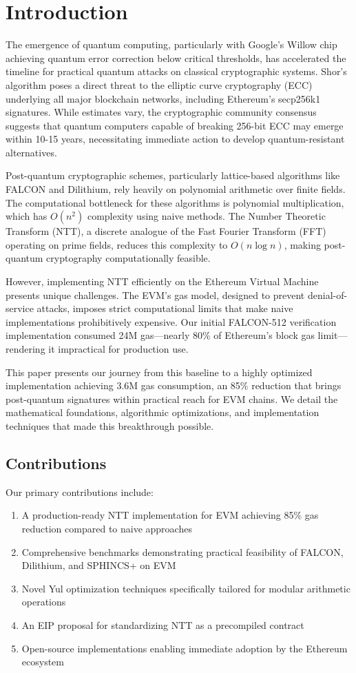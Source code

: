 \section{Introduction}


The emergence of quantum computing, particularly with Google's Willow chip achieving quantum error correction below critical thresholds, has accelerated the timeline for practical quantum attacks on classical cryptographic systems. Shor's algorithm poses a direct threat to the elliptic curve cryptography (ECC) underlying all major blockchain networks, including Ethereum's secp256k1 signatures. While estimates vary, the cryptographic community consensus suggests that quantum computers capable of breaking 256-bit ECC may emerge within 10-15 years, necessitating immediate action to develop quantum-resistant alternatives.

Post-quantum cryptographic schemes, particularly lattice-based algorithms like FALCON and Dilithium, rely heavily on polynomial arithmetic over finite fields. The computational bottleneck for these algorithms is polynomial multiplication, which has $O(n^2)$ complexity using naive methods. The Number Theoretic Transform (NTT), a discrete analogue of the Fast Fourier Transform (FFT) operating on prime fields, reduces this complexity to $O(n \log n)$, making post-quantum cryptography computationally feasible.

However, implementing NTT efficiently on the Ethereum Virtual Machine presents unique challenges. The EVM's gas model, designed to prevent denial-of-service attacks, imposes strict computational limits that make naive implementations prohibitively expensive. Our initial FALCON-512 verification implementation consumed 24M gas—nearly 80\% of Ethereum's block gas limit—rendering it impractical for production use.

This paper presents our journey from this baseline to a highly optimized implementation achieving 3.6M gas consumption, an 85\% reduction that brings post-quantum signatures within practical reach for EVM chains. We detail the mathematical foundations, algorithmic optimizations, and implementation techniques that made this breakthrough possible.

\subsection{Contributions}

Our primary contributions include:
\begin{enumerate}
\item A production-ready NTT implementation for EVM achieving 85\% gas reduction compared to naive approaches
\item Comprehensive benchmarks demonstrating practical feasibility of FALCON, Dilithium, and SPHINCS+ on EVM
\item Novel Yul optimization techniques specifically tailored for modular arithmetic operations
\item An EIP proposal for standardizing NTT as a precompiled contract
\item Open-source implementations enabling immediate adoption by the Ethereum ecosystem
\end{enumerate}


